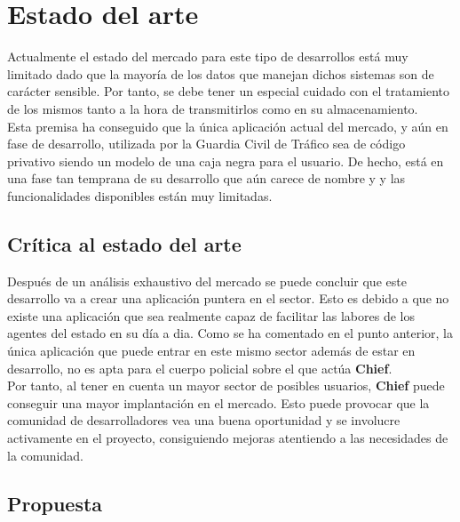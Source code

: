 \chapter{Estado del arte}

Actualmente el estado del mercado para este tipo de desarrollos está muy limitado dado que 
la mayoría de los datos que manejan dichos sistemas son de carácter sensible. Por tanto, se 
debe tener un especial cuidado con el tratamiento de los mismos tanto a la hora de transmitirlos
como en su almacenamiento.\\

Esta premisa ha conseguido que la única aplicación actual del mercado, y aún en fase de desarrollo,
utilizada por la Guardia Civil de Tráfico sea de código privativo siendo un modelo de una caja negra
para el usuario. De hecho, está en una fase tan temprana de su desarrollo que aún carece de nombre y 
y las funcionalidades disponibles están muy limitadas.\\ 


\section{Crítica al estado del arte}

Después de un análisis exhaustivo del mercado se puede concluir que este desarrollo va a crear
una aplicación puntera en el sector. Esto es debido a que no existe una aplicación que sea
realmente capaz de facilitar las labores de los agentes del estado en su día a dia. Como se 
ha comentado en el punto anterior, la única aplicación que puede entrar en este mismo sector
además de estar en desarrollo, no es apta para el cuerpo policial sobre el que actúa \textbf{Chief}.\\ 

Por tanto, al tener en cuenta un mayor sector de posibles usuarios, \textbf{Chief} puede conseguir 
una mayor implantación en el mercado. Esto puede provocar que la comunidad de desarrolladores vea
una buena oportunidad y se involucre activamente en el proyecto, consiguiendo mejoras atentiendo a
las necesidades de la comunidad.

\section{Propuesta}

